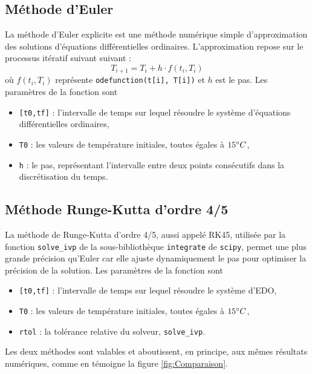 \documentclass[12pt]{article}
\begin{document}
    \subsection{Méthode d'Euler}

        La méthode d’Euler explicite est une méthode numérique simple d’approximation des solutions d’équations différentielles ordinaires. L’approximation repose sur le processus itératif suivant suivant :
        \begin{equation}
            T_{i+1} = T_i + h\cdot f(t_i, T_i)
        \end{equation}
        où $f(t_i, T_i)$ représente \texttt{odefunction(t[i], T[i])} et $h$ est le pas.
        Les paramètres de la fonction sont
        \begin{itemize}
            \item \texttt{[t0,tf]} : l'intervalle de temps sur lequel résoudre le système d'équations différentielles ordinaires,
            \item \texttt{T0} : les valeurs de température initiales, toutes égales à $15\degree C$,
            \item \texttt{h} : le pas, représentant l'intervalle entre deux points consécutifs dans la discrétisation du temps.
        \end{itemize}
        
    \subsection{Méthode Runge-Kutta d'ordre 4/5}

        La méthode de Runge-Kutta d'ordre 4/5, aussi appelé RK45, utilisée par la fonction \texttt{solve\_ivp} de la sous-bibliothèque \texttt{integrate} de \texttt{scipy}, permet une plus grande précision qu'Euler car elle ajuste dynamiquement le pas pour optimiser la précision de la solution.
        Les paramètres de la fonction sont
        \begin{itemize}
            \item \texttt{[t0,tf]} : l'intervalle de temps sur lequel résoudre le système d'EDO,
            \item \texttt{T0} : les valeurs de température initiales, toutes égales à $15\degree C$,
            \item \texttt{rtol} : la tolérance relative du solveur, \texttt{solve\_ivp}.
        \end{itemize}

        Les deux méthodes sont valables et aboutissent, en principe, aux mêmes résultats numériques, comme en témoigne la figure \ref{fig:Comparaison}.
        
\end{document}
